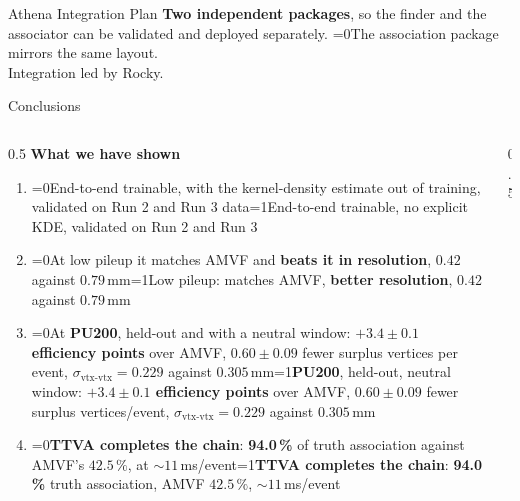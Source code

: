 \documentclass[xcolor=table,aspectratio=169]{beamer}
\providecommand{\talkbuild}{0}
\newcommand{\readingonly}[1]{\ifnum\talkbuild=0\relax#1\fi}
\newcommand{\talkonly}[1]{\ifnum\talkbuild=1\relax#1\fi}
\begin{document}
\begin{frame}{Athena Integration Plan}
    \vspace{0.6em}
    {\small\textcolor{black!65}{\textbf{Two independent packages}, so the finder and the
    associator can be validated and deployed separately. \readingonly{The association
    package mirrors the same layout.}}}\\[0.3em]
    {\scriptsize\textcolor{black!50}{Integration led by Rocky.}}
\end{frame}

\begin{frame}{Conclusions}
    \begin{columns}[t]
        \begin{column}{0.5\linewidth}
            \textbf{What we have shown}
            \begin{enumerate}
                \setlength\itemsep{0.5em}
                \item \small \readingonly{End-to-end trainable, with the kernel-density estimate out
                    of training, validated on Run 2 and Run 3 data}\talkonly{End-to-end trainable,
                    no explicit KDE, validated on Run 2 and Run 3}
                \item \small \readingonly{At low pileup it matches AMVF and \textbf{beats it in
                    resolution}, $0.42$ against $0.79$\,mm}\talkonly{Low pileup: matches AMVF,
                    \textbf{better resolution}, $0.42$ against $0.79$\,mm}
                \item \small \readingonly{At \textbf{PU200}, held-out and with a neutral window:
                    \textbf{$+3.4 \pm 0.1$ efficiency points} over AMVF,
                    $0.60 \pm 0.09$ fewer surplus vertices per event,
                    $\sigma_{\text{vtx-vtx}} = 0.229$ against $0.305$\,mm}\talkonly{\textbf{PU200},
                    held-out, neutral window: \textbf{$+3.4 \pm 0.1$ efficiency points} over AMVF,
                    $0.60 \pm 0.09$ fewer surplus vertices/event,
                    $\sigma_{\text{vtx-vtx}} = 0.229$ against $0.305$\,mm}
                \item \small \readingonly{\textbf{TTVA completes the chain}: \textbf{94.0\,\%} of
                    truth association against AMVF's $42.5\,\%$, at
                    ${\sim}11$\,ms/event}\talkonly{\textbf{TTVA completes the chain}:
                    \textbf{94.0\,\%} truth association, AMVF $42.5\,\%$, ${\sim}11$\,ms/event}
            \end{enumerate}
        \end{column}
        \begin{column}{0.5\linewidth}

\end{column}
\end{columns}
\end{frame}
\end{document}
